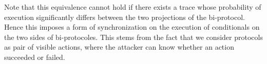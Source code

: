 Note that this equivalence cannot hold if there exists a trace whose probability
of execution significantly differs between the two projections of the
bi-protocol. Hence this imposes a form of synchronization on the execution of
conditionals on the two sides of bi-protocoles. This stems from the fact that we
consider protocols as pair of visible actions, where the attacker can know
whether an action succeeded or failed.







